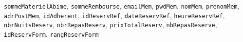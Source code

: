 \documentclass[12pt, a4paper]{article}
\newcommand\att[1]{\textnhtt{#1}}
\begin{document}
\att{sommeMaterielAbime},
\att{sommeRembourse},
\att{emailMem}, %
\att{pwdMem}, %
\att{nomMem}, %
\att{prenomMem}, %
\att{adrPostMem}, %
\att{idAdherent}, %
\att{idReservRef}, %
\att{dateReservRef}, %
\att{heureReservRef}, %
\att{nbrNuitsReserv}, %
\att{nbrRepasReserv}, %
\att{prixTotalReserv}, %
\att{nbRepasReserve},
\att{idReservForm}, %
\att{rangReservForm} %
\end{document}

